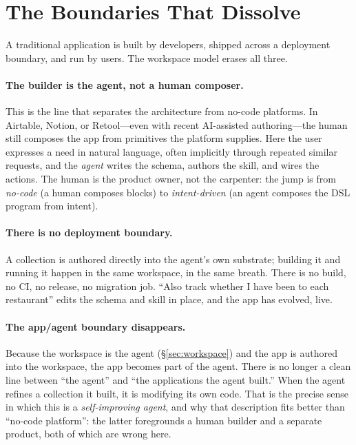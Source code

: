 \documentclass[11pt]{article}
\begin{document}
\section{The Boundaries That Dissolve}
\label{sec:boundaries}

A traditional application is built by developers, shipped across a deployment
boundary, and run by users. The workspace model erases all three.

\paragraph{The builder is the agent, not a human composer.}
This is the line that separates the architecture from no-code platforms. In
Airtable, Notion, or Retool---even with recent AI-assisted authoring---the human
still composes the app from primitives the platform supplies. Here the user
expresses a need in natural language, often implicitly through repeated similar
requests, and the \emph{agent} writes the schema, authors the skill, and wires the
actions. The human is the product owner, not the carpenter: the jump is from
\emph{no-code} (a human composes blocks) to \emph{intent-driven} (an agent composes
the DSL program from intent).

\paragraph{There is no deployment boundary.}
A collection is authored directly into the agent's own substrate; building it and
running it happen in the same workspace, in the same breath. There is no build, no
CI, no release, no migration job. ``Also track whether I have been to each
restaurant'' edits the schema and skill in place, and the app has evolved, live.

\paragraph{The app/agent boundary disappears.}
Because the workspace is the agent (\S\ref{sec:workspace}) and the app is authored
into the workspace, the app becomes part of the agent. There is no longer a clean
line between ``the agent'' and ``the applications the agent built.'' When the agent
refines a collection it built, it is modifying its own code. That is the precise
sense in which this is a \emph{self-improving agent}, and why that description fits
better than ``no-code platform'': the latter foregrounds a human builder and a
separate product, both of which are wrong here.
\end{document}
